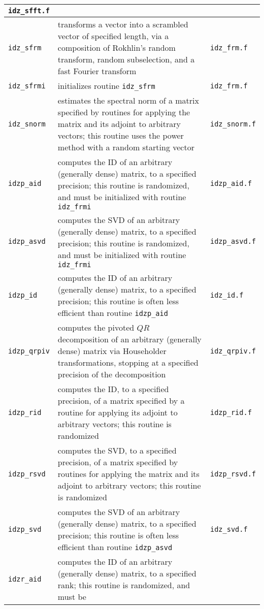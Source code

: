 ﻿\documentclass[letterpaper,12pt]{article}
\begin{document}
\begin{center}
\begin{supertabular}{>{\raggedright}p{1.2in} p{.53\textwidth} l}
{\tt idz\_sfft.f} \\\hline
%
{\tt idz\_sfrm} & transforms a vector into a scrambled vector of
specified length, via a composition of Rokhlin's random transform,
random subselection, and a fast Fourier transform & {\tt idz\_frm.f}
\\\hline
%
{\tt idz\_sfrmi} & initializes routine {\tt idz\_sfrm} &
{\tt idz\_frm.f} \\\hline
%
{\tt idz\_snorm} & estimates the spectral norm of a matrix specified by
routines for applying the matrix and its adjoint to arbitrary
vectors; this routine uses the power method with a random starting
vector & {\tt idz\_snorm.f} \\\hline
%
{\tt idzp\_aid} & computes the ID of an arbitrary (generally dense)
matrix, to a specified precision; this routine is randomized, and must
be initialized with routine {\tt idz\_frmi} & {\tt idzp\_aid.f}
\\\hline
%
{\tt idzp\_asvd} & computes the SVD of an arbitrary (generally dense)
matrix, to a specified precision; this routine is randomized, and must
be initialized with routine {\tt idz\_frmi} & {\tt idzp\_asvd.f}
\\\hline
%
{\tt idzp\_id} & computes the ID of an arbitrary (generally dense)
matrix, to a specified precision; this routine is often less efficient
than routine {\tt idzp\_aid} & {\tt idz\_id.f} \\\hline
%
{\tt idzp\_qrpiv} & computes the pivoted $QR$ decomposition of an
arbitrary (generally dense) matrix via Householder transformations,
stopping at a specified precision of the decomposition &
{\tt idz\_qrpiv.f} \\\hline
%
{\tt idzp\_rid} & computes the ID, to a specified precision, of a
matrix specified by a routine for applying its adjoint to arbitrary
vectors; this routine is randomized & {\tt idzp\_rid.f} \\\hline
%
{\tt idzp\_rsvd} & computes the SVD, to a specified precision, of a
matrix specified by routines for applying the matrix and its adjoint
to arbitrary vectors; this routine is randomized & {\tt idzp\_rsvd.f}
\\\hline
%
{\tt idzp\_svd} & computes the SVD of an arbitrary (generally dense)
matrix, to a specified precision; this routine is often less efficient
than routine {\tt idzp\_asvd} & {\tt idz\_svd.f} \\\hline
%
{\tt idzr\_aid} & computes the ID of an arbitrary (generally dense)
matrix, to a specified rank; this routine is randomized, and must be

\end{supertabular}
\end{center}
\end{document}
